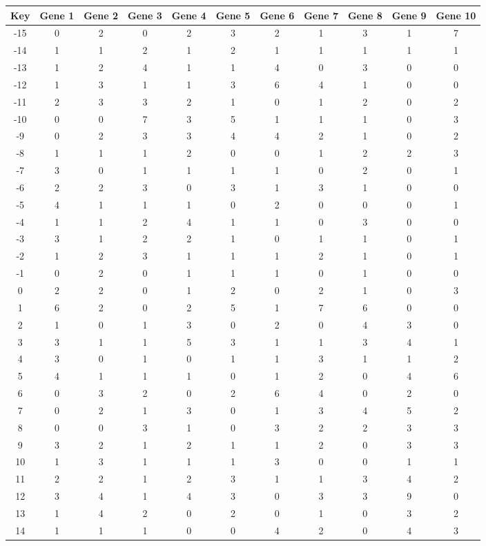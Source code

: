 \begin{tabular}{|c|c|c|c|c|c|c|c|c|c|c|}
\hline
Key & Gene 1 & Gene 2 & Gene 3 & Gene 4 & Gene 5 & Gene 6 & Gene 7 & Gene 8 & Gene 9 & Gene 10 \\
\hline
-15 & 0 & 2 & 0 & 2 & 3 & 2 & 1 & 3 & 1 & 7 \\
-14 & 1 & 1 & 2 & 1 & 2 & 1 & 1 & 1 & 1 & 1 \\
-13 & 1 & 2 & 4 & 1 & 1 & 4 & 0 & 3 & 0 & 0 \\
-12 & 1 & 3 & 1 & 1 & 3 & 6 & 4 & 1 & 0 & 0 \\
-11 & 2 & 3 & 3 & 2 & 1 & 0 & 1 & 2 & 0 & 2 \\
-10 & 0 & 0 & 7 & 3 & 5 & 1 & 1 & 1 & 0 & 3 \\
-9 & 0 & 2 & 3 & 3 & 4 & 4 & 2 & 1 & 0 & 2 \\
-8 & 1 & 1 & 1 & 2 & 0 & 0 & 1 & 2 & 2 & 3 \\
-7 & 3 & 0 & 1 & 1 & 1 & 1 & 0 & 2 & 0 & 1 \\
-6 & 2 & 2 & 3 & 0 & 3 & 1 & 3 & 1 & 0 & 0 \\
-5 & 4 & 1 & 1 & 1 & 0 & 2 & 0 & 0 & 0 & 1 \\
-4 & 1 & 1 & 2 & 4 & 1 & 1 & 0 & 3 & 0 & 0 \\
-3 & 3 & 1 & 2 & 2 & 1 & 0 & 1 & 1 & 0 & 1 \\
-2 & 1 & 2 & 3 & 1 & 1 & 1 & 2 & 1 & 0 & 1 \\
-1 & 0 & 2 & 0 & 1 & 1 & 1 & 0 & 1 & 0 & 0 \\
0 & 2 & 2 & 0 & 1 & 2 & 0 & 2 & 1 & 0 & 3 \\
1 & 6 & 2 & 0 & 2 & 5 & 1 & 7 & 6 & 0 & 0 \\
2 & 1 & 0 & 1 & 3 & 0 & 2 & 0 & 4 & 3 & 0 \\
3 & 3 & 1 & 1 & 5 & 3 & 1 & 1 & 3 & 4 & 1 \\
4 & 3 & 0 & 1 & 0 & 1 & 1 & 3 & 1 & 1 & 2 \\
5 & 4 & 1 & 1 & 1 & 0 & 1 & 2 & 0 & 4 & 6 \\
6 & 0 & 3 & 2 & 0 & 2 & 6 & 4 & 0 & 2 & 0 \\
7 & 0 & 2 & 1 & 3 & 0 & 1 & 3 & 4 & 5 & 2 \\
8 & 0 & 0 & 3 & 1 & 0 & 3 & 2 & 2 & 3 & 3 \\
9 & 3 & 2 & 1 & 2 & 1 & 1 & 2 & 0 & 3 & 3 \\
10 & 1 & 3 & 1 & 1 & 1 & 3 & 0 & 0 & 1 & 1 \\
11 & 2 & 2 & 1 & 2 & 3 & 1 & 1 & 3 & 4 & 2 \\
12 & 3 & 4 & 1 & 4 & 3 & 0 & 3 & 3 & 9 & 0 \\
13 & 1 & 4 & 2 & 0 & 2 & 0 & 1 & 0 & 3 & 2 \\
14 & 1 & 1 & 1 & 0 & 0 & 4 & 2 & 0 & 4 & 3 \\
\hline
\end{tabular}